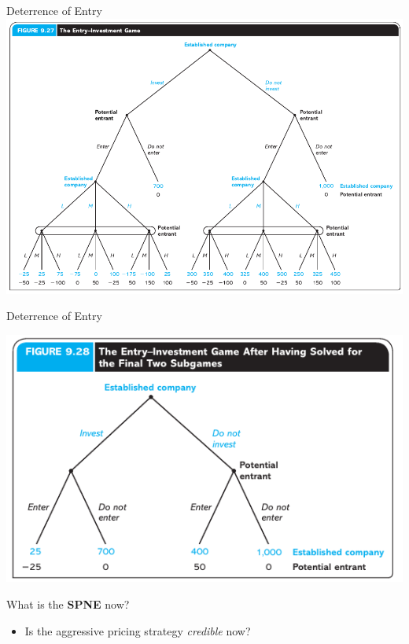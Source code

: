 \begin{frame}{Deterrence of Entry}
  \includegraphics[width=1\textwidth]{figures/fig927.png} 
\end{frame}

\begin{frame}{Deterrence of Entry}
  \begin{center}
  \includegraphics[width=.8\textwidth]{figures/fig928.png}
  \end{center}
  What is the \textbf{SPNE} now?
  \begin{itemize}
    \item Is the aggressive pricing strategy \textit{credible} now? 
  \end{itemize}
\end{frame}

